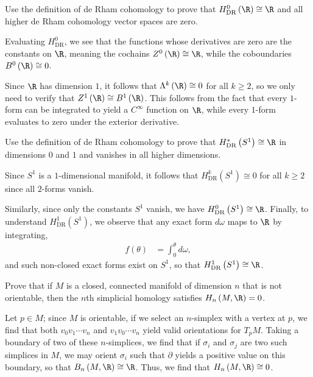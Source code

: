 \documentclass[10pt]{mypackage}
\begin{document}
\begin{problem}[Problem 2]
  Use the definition of de Rham cohomology to prove that $H^{0}_{\operatorname{DR}}\left( \R \right)\cong \R$ and all higher de Rham cohomology vector spaces are zero.
\end{problem}
\begin{solution}
  Evaluating $H^{0}_{\operatorname{DR}}$, we see that the functions whose derivatives are zero are the constants on $\R$, meaning the cochains $Z^{0}\left( \R \right) \cong \R$, while the coboundaries $B^{0}\left( \R \right)\cong 0$.\newline

  Since $\R$ has dimension $1$, it follows that $\Lambda^{k}\left( \R \right) \cong 0$ for all $k\geq 2$, so we only need to verify that $Z^{1}\left( \R \right)\cong B^{1}\left( \R \right)$. This follows from the fact that every $1$-form can be integrated to yield a $C^{\infty}$ function on $\R$, while every $1$-form evaluates to zero under the exterior derivative.
\end{solution}
\begin{problem}[Problem 3]
  Use the definition of de Rham cohomology to prove that $H^{\ast}_{\operatorname{DR}}\left( S^{1} \right)\cong \R$ in dimensions $0$ and $1$ and vanishes in all higher dimensions.
\end{problem}
\begin{solution}
  Since $S^{1}$ is a $1$-dimensional manifold, it follows that $H^{k}_{\operatorname{DR}}\left( S^{1} \right)\cong 0$ for all $k\geq 2$ since all $2$-forms vanish.\newline

  Similarly, since only the constants $S^{1}$ vanish, we have $H^{0}_{\operatorname{DR}}\left( S^{1} \right)\cong \R$. Finally, to understand $H^{1}_{\operatorname{DR}}\left( S^{1} \right)$, we observe that any exact form $d\omega$ maps to $\R$ by integrating,
  \begin{align*}
    f(\theta) &= \int_{0}^{\theta}d\omega,
  \end{align*}
  and such non-closed exact forms exist on $S^{1}$, so that $H^{1}_{\operatorname{DR}}\left( S^{1} \right)\cong \R$.
\end{solution}
\begin{problem}[Problem 4]
  Prove that if $M$ is a closed, connected manifold of dimension $n$ that is not orientable, then the $n$th simplicial homology satisfies $H_n\left( M,\R \right) = 0$.
\end{problem}
\begin{solution}
  Let $p\in M$; since $M$ is orientable, if we select an $n$-simplex with a vertex at $p$, we find that both $v_0v_1\cdots v_n$ and $v_1v_0\cdots v_n$ yield valid orientations for $T_pM$. Taking a boundary of two of these $n$-simplices, we find that if $\sigma_i$ and $\sigma_j$ are two such simplices in $M$, we may orient $\sigma_i$ such that $\partial$ yields a positive value on this boundary, so that $B_n\left( M,\R \right)\cong \R$. Thus, we find that $H_n\left( M,\R \right)\cong 0$.
\end{solution}
\end{document}
